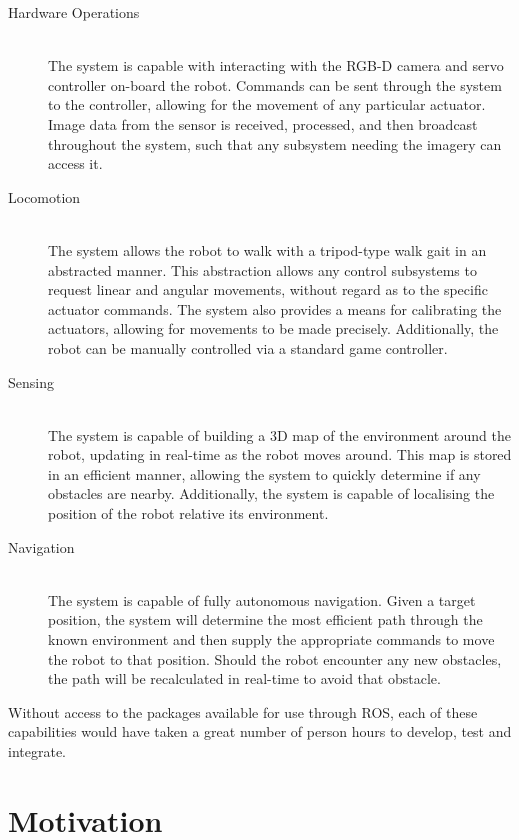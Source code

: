 \begin{description}
	\item[Hardware Operations] \hfill \\
	The system is capable with interacting with the RGB-D camera and servo controller on-board the robot. Commands can be sent through the system to the controller, allowing for the movement of any particular actuator. Image data from the sensor is received, processed, and then broadcast throughout the system, such that any subsystem needing the imagery can access it.

	\item[Locomotion] \hfill \\
	The system allows the robot to walk with a tripod-type walk gait in an abstracted manner. This abstraction allows any control subsystems to request linear and angular movements, without regard as to the specific actuator commands. The system also provides a means for calibrating the actuators, allowing for movements to be made precisely. Additionally, the robot can be manually controlled via a standard game controller.

	\item[Sensing] \hfill \\
	The system is capable of building a 3D map of the environment around the robot, updating in real-time as the robot moves around. This map is stored in an efficient manner, allowing the system to quickly determine if any obstacles are nearby. Additionally, the system is capable of localising the position of the robot relative its environment.

	\item[Navigation] \hfill \\
	The system is capable of fully autonomous navigation. Given a target position, the system will determine the most efficient path through the known environment and then supply the appropriate commands to move the robot to that position. Should the robot encounter any new obstacles, the path will be recalculated in real-time to avoid that obstacle.

\end{description}

Without access to the packages available for use through ROS, each of these capabilities would have taken a great number of person hours to develop, test and integrate. 

\section{Motivation}

